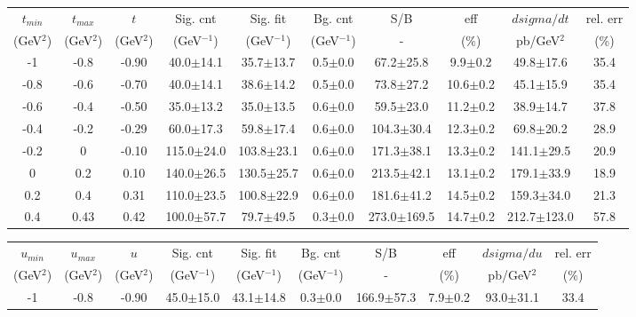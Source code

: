 \begin{landscape}
\begin{table}[hbpt]
  \begin{center}
    \begin{tabular}{|c|c|c|c|c|c|c|c|c|c|}
      \hline
      $t_{min}$ & $t_{max}$ & $t$ & Sig. cnt & Sig. fit & Bg. cnt & S/B & eff & $dsigma/dt$ & rel. err \\ 
      (GeV$^{2}$) & (GeV$^{2}$) & (GeV$^{2}$) & (GeV$^{-1}$) & (GeV$^{-1}$) & (GeV$^{-1}$) & - & (\%) & pb/GeV$^{2}$ & (\%) \\	
      \hline
 -1 & -0.8 & -0.90 & 40.0$\pm$14.1 &  35.7$\pm$13.7 &  0.5$\pm$0.0 &  67.2$\pm$25.8 & 9.9$\pm$0.2 &  49.8$\pm$17.6 & 35.4 \\ 
 \hline 
 -0.8 & -0.6 & -0.70 & 40.0$\pm$14.1 &  38.6$\pm$14.2 &  0.5$\pm$0.0 &  73.8$\pm$27.2 & 10.6$\pm$0.2 &  45.1$\pm$15.9 & 35.4 \\ 
 \hline 
 -0.6 & -0.4 & -0.50 & 35.0$\pm$13.2 &  35.0$\pm$13.5 &  0.6$\pm$0.0 &  59.5$\pm$23.0 & 11.2$\pm$0.2 &  38.9$\pm$14.7 & 37.8 \\ 
 \hline 
 -0.4 & -0.2 & -0.29 & 60.0$\pm$17.3 &  59.8$\pm$17.4 &  0.6$\pm$0.0 &  104.3$\pm$30.4 & 12.3$\pm$0.2 &  69.8$\pm$20.2 & 28.9 \\ 
 \hline 
 -0.2 & 0 & -0.10 & 115.0$\pm$24.0 &  103.8$\pm$23.1 &  0.6$\pm$0.0 &  171.3$\pm$38.1 & 13.3$\pm$0.2 &  141.1$\pm$29.5 & 20.9 \\ 
 \hline 
 0 & 0.2 & 0.10 & 140.0$\pm$26.5 &  130.5$\pm$25.7 &  0.6$\pm$0.0 &  213.5$\pm$42.1 & 13.1$\pm$0.2 &  179.1$\pm$33.9 & 18.9 \\ 
 \hline 
 0.2 & 0.4 & 0.31 & 110.0$\pm$23.5 &  100.8$\pm$22.9 &  0.6$\pm$0.0 &  181.6$\pm$41.2 & 14.5$\pm$0.2 &  159.3$\pm$34.0 & 21.3 \\ 
 \hline 
 0.4 & 0.43 & 0.42 & 100.0$\pm$57.7 &  79.7$\pm$49.5 &  0.3$\pm$0.0 &  273.0$\pm$169.5 & 14.7$\pm$0.2 &  212.7$\pm$123.0 & 57.8 \\ 
 \hline 
    \end{tabular}
    \begin{tabular}{|c|c|c|c|c|c|c|c|c|c|}
      \hline
      $u_{min}$ & $u_{max}$ & $u$ & Sig. cnt & Sig. fit & Bg. cnt & S/B & eff & $dsigma/du$ & rel. err \\ 
      (GeV$^{2}$) & (GeV$^{2}$) & (GeV$^{2}$) & (GeV$^{-1}$) & (GeV$^{-1}$) & (GeV$^{-1}$) & - & (\%) & pb/GeV$^{2}$ & (\%) \\	
      \hline
 -1 & -0.8 & -0.90 & 45.0$\pm$15.0 &  43.1$\pm$14.8 &  0.3$\pm$0.0 &  166.9$\pm$57.3 & 7.9$\pm$0.2 &  93.0$\pm$31.1 & 33.4 \\ 

\end{tabular}
\end{center}
\end{table}
\end{landscape}
